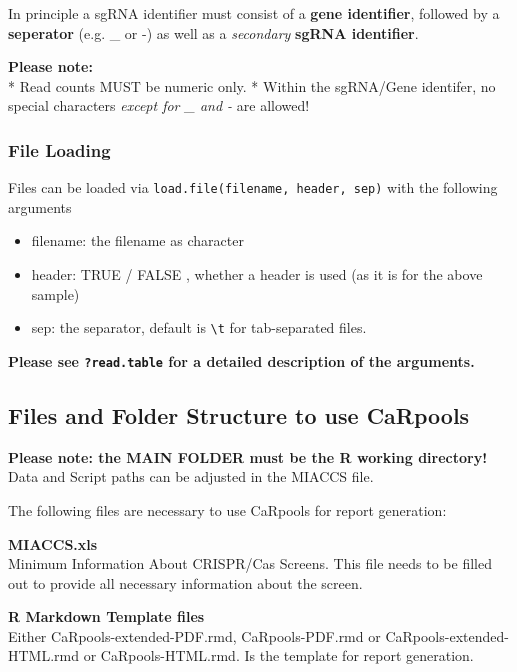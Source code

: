 \documentclass[]{article}
\providecommand{\tightlist}{%
  \setlength{\itemsep}{0pt}\setlength{\parskip}{0pt}}
\begin{document}
In principle a sgRNA identifier must consist of a \textbf{gene
identifier}, followed by a \textbf{seperator} (e.g. \_ or -) as well as
a \emph{secondary} \textbf{sgRNA identifier}.

\textbf{Please note:}\\
* Read counts MUST be numeric only. * Within the sgRNA/Gene identifer,
no special characters \emph{except for \_ and -} are allowed!

\subsubsection{File Loading}\label{file-loading}

Files can be loaded via \texttt{load.file(filename,\ header,\ sep)} with
the following arguments

\begin{itemize}
\tightlist
\item
  filename: the filename as character
\item
  header: TRUE / FALSE , whether a header is used (as it is for the
  above sample)
\item
  sep: the separator, default is \texttt{\textbackslash{}t} for
  tab-separated files.
\end{itemize}

\textbf{Please see \texttt{?read.table} for a detailed description of
the arguments.}

\subsection{Files and Folder Structure to use
CaRpools}\label{files-and-folder-structure-to-use-carpools}

\textbf{Please note: the MAIN FOLDER must be the R working directory!}\\
Data and Script paths can be adjusted in the MIACCS file.

The following files are necessary to use CaRpools for report generation:

\textbf{MIACCS.xls}\\
Minimum Information About CRISPR/Cas Screens. This file needs to be
filled out to provide all necessary information about the screen.

\textbf{R Markdown Template files}\\
Either CaRpools-extended-PDF.rmd, CaRpools-PDF.rmd or
CaRpools-extended-HTML.rmd or CaRpools-HTML.rmd. Is the template for
report generation.
\end{document}

